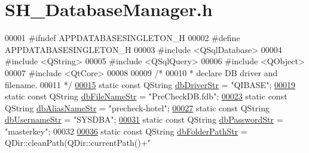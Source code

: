 \hypertarget{SH__DatabaseManager_8h_source}{\section{S\-H\-\_\-\-Database\-Manager.\-h}
}

\begin{DoxyCode}
00001 \textcolor{preprocessor}{#ifndef APPDATABASESINGLETON\_H}
00002 \textcolor{preprocessor}{}\textcolor{preprocessor}{#define APPDATABASESINGLETON\_H}
00003 \textcolor{preprocessor}{}\textcolor{preprocessor}{#include <QSqlDatabase>}
00004 \textcolor{preprocessor}{#include <QString>}
00005 \textcolor{preprocessor}{#include <QSqlQuery>}
00006 \textcolor{preprocessor}{#include <QObject>}
00007 \textcolor{preprocessor}{#include <QtCore>}
00008 
00009 \textcolor{comment}{/*}
00010 \textcolor{comment}{ * declare DB driver and filename.}
00011 \textcolor{comment}{ */}
\hypertarget{SH__DatabaseManager_8h_source_l00015}{}\hyperlink{SH__DatabaseManager_8h_a867ada6d1926e2ded0e68678e02a19c7}{00015} \textcolor{keyword}{static} \textcolor{keyword}{const} QString \hyperlink{SH__DatabaseManager_8h_a867ada6d1926e2ded0e68678e02a19c7}{dbDriverStr} = \textcolor{stringliteral}{"QIBASE"};
\hypertarget{SH__DatabaseManager_8h_source_l00019}{}\hyperlink{SH__DatabaseManager_8h_a6c6a636455d1d86d7215a52de4bc6828}{00019} \textcolor{keyword}{static} \textcolor{keyword}{const} QString \hyperlink{SH__DatabaseManager_8h_a6c6a636455d1d86d7215a52de4bc6828}{dbFileNameStr} = \textcolor{stringliteral}{"PreCheckDB.fdb"};
\hypertarget{SH__DatabaseManager_8h_source_l00023}{}\hyperlink{SH__DatabaseManager_8h_a6ea3da6c82e06907039cdf906ae15fd1}{00023} \textcolor{keyword}{static} \textcolor{keyword}{const} QString \hyperlink{SH__DatabaseManager_8h_a6ea3da6c82e06907039cdf906ae15fd1}{dbAliasNameStr} = \textcolor{stringliteral}{"precheck-hotel"};
\hypertarget{SH__DatabaseManager_8h_source_l00027}{}\hyperlink{SH__DatabaseManager_8h_a15964752bd7d7c2075f3bafca2218411}{00027} \textcolor{keyword}{static} \textcolor{keyword}{const} QString \hyperlink{SH__DatabaseManager_8h_a15964752bd7d7c2075f3bafca2218411}{dbUsernameStr} = \textcolor{stringliteral}{"SYSDBA"};
\hypertarget{SH__DatabaseManager_8h_source_l00031}{}\hyperlink{SH__DatabaseManager_8h_a5dbd4602b69f5a87243d49f9c873ac64}{00031} \textcolor{keyword}{static} \textcolor{keyword}{const} QString \hyperlink{SH__DatabaseManager_8h_a5dbd4602b69f5a87243d49f9c873ac64}{dbPasswordStr} = \textcolor{stringliteral}{"masterkey"};
00032 
\hypertarget{SH__DatabaseManager_8h_source_l00036}{}\hyperlink{SH__DatabaseManager_8h_a74e17c2ab66452c74a37bdc0f32e9e08}{00036} \textcolor{keyword}{static} \textcolor{keyword}{const} QString \hyperlink{SH__DatabaseManager_8h_a74e17c2ab66452c74a37bdc0f32e9e08}{dbFolderPathStr} = QDir::cleanPath(QDir::currentPath()+\textcolor{stringliteral}{"
}
\end{DoxyCode}
